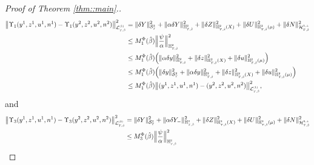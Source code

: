 \documentclass[10pt]{article} %
\newcommand\cH{\mathcal H}
\newcommand\cL{\mathcal L}
\newcommand\cS{\mathcal S}
\newcommand{\smalltext}[1]{\text{\fontsize{4}{4}\selectfont$#1$}}
\def \H{\mathbb{H}}
\newcommand{\1}{\mathbf{1}}
\begin{document}
\begin{proof}[Proof of Theorem \ref{thm::main}.]
\begin{align*}
		\big\| \Upsilon_1(y^1,z^1,u^1,n^1) - \Upsilon_1(y^2,z^2,u^2,n^2) \big\|^2_{\cL^\smalltext{(1)}_{\smalltext{T}\smalltext{,}\smalltext{\hat\beta}}} 
		&= \|\delta Y\|^2_{\cS^\smalltext{2}_\smalltext{T}} + \|\alpha\delta Y\|^2_{\H^\smalltext{2}_{\smalltext{T}\smalltext{,}\smalltext{\hat\beta}}} + \|\delta Z\|^2_{\H^\smalltext{2}_{\smalltext{T}\smalltext{,}\smalltext{\hat\beta}}(X)} + \|\delta U\|^2_{\H^\smalltext{2}_{\smalltext{T}\smalltext{,}\smalltext{\hat\beta}}(\mu)} + \|\delta N\|^2_{\cH^{\smalltext{2}\smalltext{,}\smalltext{\perp}}_{\smalltext{T}\smalltext{,}\smalltext{\hat\beta}}} \nonumber\\
		&\leq M^\Phi_1(\hat\beta) \Big\| \frac{\psi}{\alpha} \Big\|^2_{\H^\smalltext{2}_{\smalltext{T}\smalltext{,}\smalltext{\hat\beta}}} \nonumber\\
		&\leq M^\Phi_1(\hat\beta) \Big(\|\alpha\delta y\|^2_{\H^\smalltext{2}_{\smalltext{T}\smalltext{,}\smalltext{\hat\beta}}} + \|\delta z\|^2_{\H^\smalltext{2}_{\smalltext{T}\smalltext{,}\smalltext{\hat\beta}}(X)} + \|\delta u\|^2_{\H^\smalltext{2}_{\smalltext{T}\smalltext{,}\smalltext{\hat\beta}}(\mu)} \Big)  \nonumber\\
		&\leq M^\Phi_1(\hat\beta) \Big( \|\delta y\|^2_{\cS^\smalltext{2}_\smalltext{T}} + \|\alpha\delta y\|^2_{\H^\smalltext{2}_{\smalltext{T}\smalltext{,}\smalltext{\hat\beta}}} + \|\delta z\|^2_{\H^\smalltext{2}_{\smalltext{T}\smalltext{,}\smalltext{\hat\beta}}(X)} + \|\delta u\|^2_{\H^\smalltext{2}_{\smalltext{T}\smalltext{,}\smalltext{\hat\beta}}(\mu)} \Big)  \nonumber\\
		&\leq M^\Phi_1(\hat\beta) \big\|(y^1, z^1, u^1, n^1) - (y^2, z^2, u^2, n^2)\big\|^2_{\cL^\smalltext{(1)}_{\smalltext{T}\smalltext{,}\smalltext{\hat\beta}}},
	\end{align*}
	and
	\begin{align*}
		\big\| \Upsilon_3(y^1,z^1,u^1,n^1) - \Upsilon_3(y^2,z^2,u^2,n^2) \big\|^2_{\cL^\smalltext{(3)}_{\smalltext{T}\smalltext{,}\smalltext{\hat\beta}}} 
		&= \|\delta Y\|^2_{\cS^\smalltext{2}_\smalltext{T}} + \|\alpha\delta Y_-\|^2_{\H^\smalltext{2}_{\smalltext{T}\smalltext{,}\smalltext{\hat\beta}}} + \|\delta Z\|^2_{\H^\smalltext{2}_{\smalltext{T}\smalltext{,}\smalltext{\hat\beta}}(X)} + \|\delta U\|^2_{\H^\smalltext{2}_{\smalltext{T}\smalltext{,}\smalltext{\hat\beta}}(\mu)} + \|\delta N\|^2_{\cH^{\smalltext{2}\smalltext{,}\smalltext{\perp}}_{\smalltext{T}\smalltext{,}\smalltext{\hat\beta}}} \nonumber\\
		&\leq M^\Phi_3(\hat\beta)\Big\| \frac{\psi}{\alpha} \Big\|^2_{\H^\smalltext{2}_{\smalltext{T}\smalltext{,}\smalltext{\hat\beta}}} \nonumber\\

\end{align*}
\end{proof}
\end{document}
